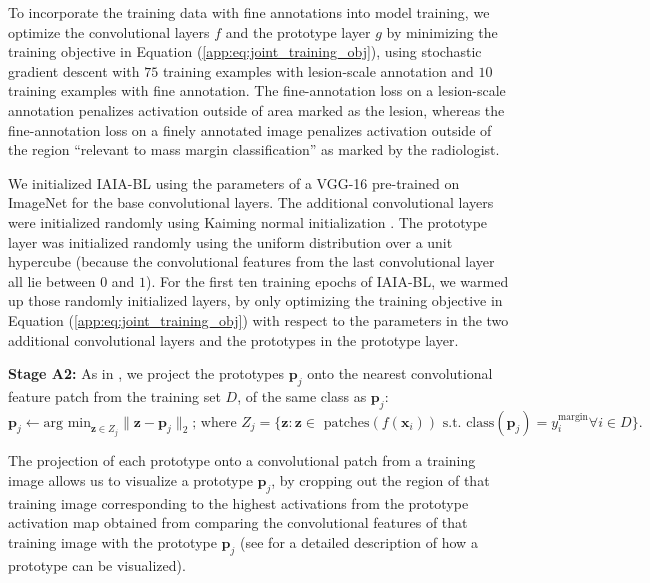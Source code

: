 \documentclass[11pt]{article}
\begin{document}
To incorporate the training data with fine annotations into model training, we optimize the convolutional layers $f$ and the prototype layer $g$ by minimizing the training objective in Equation (\ref{app:eq:joint_training_obj}), using stochastic gradient descent with $75$ training examples with lesion-scale annotation and $10$ training examples with fine annotation. The fine-annotation loss on a lesion-scale annotation penalizes activation outside of area marked as the lesion, whereas the fine-annotation loss on a finely annotated image penalizes activation outside of the region ``relevant to mass margin classification'' as marked by the radiologist. 

We initialized IAIA-BL using the parameters of a VGG-16 pre-trained on ImageNet \cite{deng2009imagenet} for the base convolutional layers. The additional convolutional layers were initialized randomly using Kaiming normal initialization \cite{he2015delving}. The prototype layer was initialized randomly using the uniform distribution over a unit hypercube (because the convolutional features from the last convolutional layer all lie between $0$ and $1$). For the first ten training epochs of IAIA-BL, we warmed up those randomly initialized layers, by only optimizing the training objective in Equation (\ref{app:eq:joint_training_obj}) with respect to the parameters in the two additional convolutional layers and the prototypes in the prototype layer.

\textbf{Stage A2:} As in \cite{PPNet}, we project the prototypes $\textbf{p}_j$ onto the nearest convolutional feature patch from the training set $D$, of the same class as $\textbf{p}_j$:
\begin{equation}
        \textbf{p}_j \leftarrow \textrm{arg min}_{\mathbf{z} \in Z_j} \|\mathbf{z} - \textbf{p}_j\|_2\text{; where } Z_j = \{\mathbf{z}: \mathbf{z} \in \text{ patches}(f(\mathbf{x}_i)) \text{ s.t. }\textrm{class}(\textbf{p}_j)=y^{\text{margin}}_i \forall i \in D\}.
\end{equation}

The projection of each prototype onto a convolutional patch from a training image allows us to visualize a prototype $\mathbf{p}_j$, by cropping out the region of that training image corresponding to the highest activations from the prototype activation map obtained from comparing the convolutional features of that training image with the prototype $\mathbf{p}_j$ (see \cite{PPNet} for a detailed description of how a prototype can be visualized).
\end{document}
